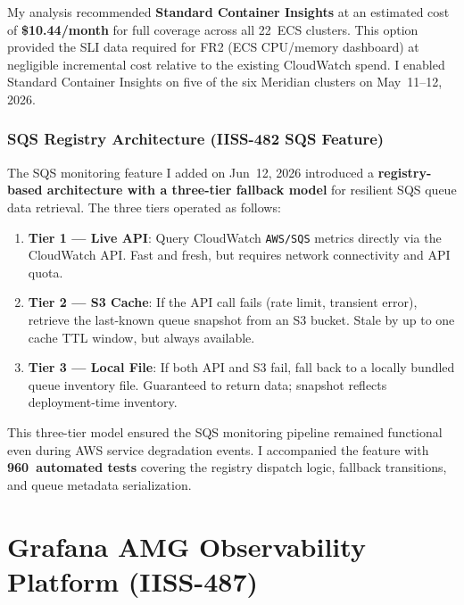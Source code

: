 My analysis recommended \textbf{Standard Container Insights} at an estimated
cost of \textbf{\$10.44/month} for full coverage across all 22~ECS clusters.
This option provided the SLI data required for FR2 (ECS CPU/memory dashboard)
at negligible incremental cost relative to the existing CloudWatch spend.
I enabled Standard Container Insights on five of the six Meridian clusters
on May~11--12, 2026.

\subsubsection{SQS Registry Architecture (IISS-482 SQS Feature)}

The SQS monitoring feature I added on Jun~12, 2026 introduced a
\textbf{registry-based architecture with a three-tier fallback model} for
resilient SQS queue data retrieval. The three tiers operated as follows:

\begin{enumerate}
    \item \textbf{Tier 1 --- Live API}: Query CloudWatch
          \texttt{AWS/SQS} metrics directly via the CloudWatch API. Fast
          and fresh, but requires network connectivity and API quota.

    \item \textbf{Tier 2 --- S3 Cache}: If the API call fails (rate
          limit, transient error), retrieve the last-known queue snapshot
          from an S3 bucket. Stale by up to one cache TTL window, but
          always available.

    \item \textbf{Tier 3 --- Local File}: If both API and S3 fail, fall
          back to a locally bundled queue inventory file. Guaranteed to
          return data; snapshot reflects deployment-time inventory.
\end{enumerate}

This three-tier model ensured the SQS monitoring pipeline remained
functional even during AWS service degradation events. I accompanied the feature with \textbf{960~automated tests} covering the registry
dispatch logic, fallback transitions, and queue metadata serialization.

\section{Grafana AMG Observability Platform (IISS-487)}
\label{sec:grafana_amg_platform}

